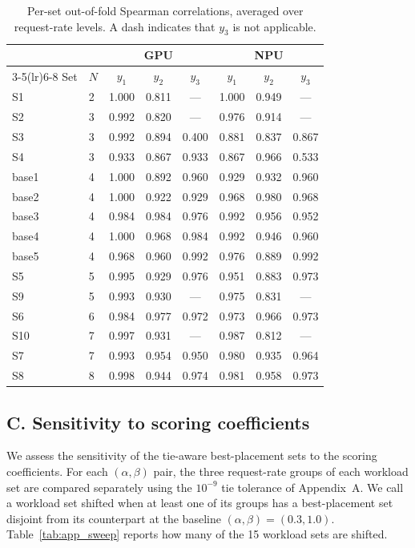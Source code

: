 \documentclass{article}
\begin{document}
\begin{table}[h]
\centering
\caption{Per-set out-of-fold Spearman correlations, averaged over request-rate levels. A dash indicates that $y_3$ is not applicable.}
\label{tab:app_perset}
\footnotesize
\setlength{\tabcolsep}{4pt}
\begin{tabular}{@{}ll ccc ccc@{}}
\toprule
& & \multicolumn{3}{c}{GPU} & \multicolumn{3}{c}{NPU} \\
\cmidrule(lr){3-5}\cmidrule(lr){6-8}
Set & $N$ & $y_1$ & $y_2$ & $y_3$ & $y_1$ & $y_2$ & $y_3$ \\
\midrule
S1 & 2 & 1.000 & 0.811 & --- & 1.000 & 0.949 & --- \\
S2 & 3 & 0.992 & 0.820 & --- & 0.976 & 0.914 & --- \\
S3 & 3 & 0.992 & 0.894 & 0.400 & 0.881 & 0.837 & 0.867 \\
S4 & 3 & 0.933 & 0.867 & 0.933 & 0.867 & 0.966 & 0.533 \\
base1 & 4 & 1.000 & 0.892 & 0.960 & 0.929 & 0.932 & 0.960 \\
base2 & 4 & 1.000 & 0.922 & 0.929 & 0.968 & 0.980 & 0.968 \\
base3 & 4 & 0.984 & 0.984 & 0.976 & 0.992 & 0.956 & 0.952 \\
base4 & 4 & 1.000 & 0.968 & 0.984 & 0.992 & 0.946 & 0.960 \\
base5 & 4 & 0.968 & 0.960 & 0.992 & 0.976 & 0.889 & 0.992 \\
S5 & 5 & 0.995 & 0.929 & 0.976 & 0.951 & 0.883 & 0.973 \\
S9 & 5 & 0.993 & 0.930 & --- & 0.975 & 0.831 & --- \\
S6 & 6 & 0.984 & 0.977 & 0.972 & 0.973 & 0.966 & 0.973 \\
S10 & 7 & 0.997 & 0.931 & --- & 0.987 & 0.812 & --- \\
S7 & 7 & 0.993 & 0.954 & 0.950 & 0.980 & 0.935 & 0.964 \\
S8 & 8 & 0.998 & 0.944 & 0.974 & 0.981 & 0.958 & 0.973 \\
\bottomrule
\end{tabular}
\end{table}

\subsection*{C. Sensitivity to scoring coefficients}

We assess the sensitivity of the tie-aware best-placement sets to the scoring coefficients. For each $(\alpha,\beta)$ pair, the three request-rate groups of each workload set are compared separately using the $10^{-9}$ tie tolerance of Appendix~A. We call a workload set shifted when at least one of its groups has a best-placement set disjoint from its counterpart at the baseline $(\alpha,\beta){=}(0.3,1.0)$. Table~\ref{tab:app_sweep} reports how many of the 15 workload sets are shifted.
\end{document}
